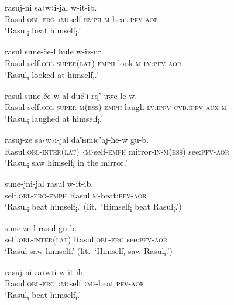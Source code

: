 ﻿\documentclass[output=paper]{langsci/langscibook}
\begin{document}
\ea \label{ex:10:3} %
\gll  rasuj-ni sa‹w›i-jal w-it-ib.\\
Rasul.\textsc{obl}-\textsc{erg} ‹\textsc{m}›self-\textsc{emph} \textsc{m}-beat:\textsc{pfv}-\textsc{aor}\\
\glt `Rasul\textsubscript{i} beat himself\textsubscript{i}.'

\ex \label{ex:10:4} %
\gll  rasul sune-če-l ħule w-iz-ur.\\
Rasul self.\textsc{obl}-\textsc{super}(\textsc{lat})-\textsc{emph} look \textsc{m}-\textsc{lv}:\textsc{pfv}-\textsc{aor}\\ 
\glt `Rasul\textsubscript{i} looked at himself\textsubscript{i}.'

\ex \label{ex:10:5} %
\gll  rasul sune-če-w-al duč'i-rq'-uwe le-w.\\
Rasul self.\textsc{obl}-\textsc{super}-\textsc{m}(\textsc{ess})-\textsc{emph} laugh-\textsc{lv}:\textsc{ipfv}-\textsc{cvb.ipfv} \textsc{aux}-\textsc{m}\\ 
\glt `Rasul\textsubscript{i} laughed at himself\textsubscript{i}.'

\ex \label{ex:10:6} %
\gll  rasuj-ze sa‹w›i-jal daˤʜmic'aj-ħe-w gu-b.\\
Rasul.\textsc{obl}-\textsc{inter}(\textsc{lat}) ‹\textsc{m}›self-\textsc{emph} mirror-\textsc{in}-\textsc{m}(\textsc{ess}) see:\textsc{pfv}-\textsc{aor}\\ 
\glt `Rasul\textsubscript{i} saw himself\textsubscript{i} in the mirror.'

\ex \label{ex:10:7} %
\ea %
\gll *sune-jni-jal rasul w-it-ib.\\
self.\textsc{obl}-\textsc{erg}-\textsc{emph} Rasul \textsc{m}-beat:\textsc{pfv}-\textsc{aor}\\ 
\glt `Rasul\textsubscript{i} beat himself\textsubscript{i}.'
(lit.\ `Himself\textsubscript{i} beat Rasul\textsubscript{i}.')

\ex %
\gll *sune-ze-l rasul gu-b.\\
self.\textsc{obl}-\textsc{inter}(\textsc{lat}) Rasul.\textsc{obl}-\textsc{erg} see:\textsc{pfv}-\textsc{aor}\\ 
\glt `Rasul saw himself.'
(lit.\ `Himself\textsubscript{i} saw Rasul\textsubscript{i}.')
\z

\ex \label{ex:10:8} %
\gll  *rasuj-ni sa‹w›i w-it-ib.\\
Rasul.\textsc{obl}-\textsc{erg} ‹\textsc{m}›self ‹\textsc{m}›-beat:\textsc{pfv}-\textsc{aor}\\ 
\glt `Rasul\textsubscript{i} beat himself\textsubscript{i}.'
\z
\end{document}
